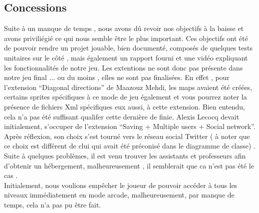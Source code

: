 \documentclass[a4paper,10pt]{article}
\begin{document}
\subsection{Concessions}
Suite à un manque de temps , nous avons dû revoir nos objectifs à la baisse et avons priviliégié ce qui nous semble être le plus important. 
Ces objectifs ont été de pouvoir rendre un projet jouable, bien documenté, composés de quelques tests unitaires sur le côté , mais 
également un rapport fourni et une vidéo expliquant les fonctionnalités de notre jeu. 
Les extentions ne sont donc pas présente dans notre jeu final ... ou du moins , elles ne sont pas finalisées.
En effet , pour l'extension ``Diagonal directions'' de Maazouz Mehdi, les maps avaient été créées, certains sprites spécifiques à ce mode de jeu également
et vous pourrez noter la présence de fichiers Xml spécifiques eux aussi, à cette extension. Bien entendu, cela n'a pas été suffisant qualifer
cette dernière de finie.
Alexis Lecocq devait initialement, s'occuper de l'extension ``Saving + Multiple users + Social network''. Après réflexion, son choix
s'est tourné vers le réseau social Twitter ( à noter que ce choix est différent de clui qui avait été préconisé dans le diagramme de classe)
. Suite à quelques problèmes, il est venu trouver les assistants et professeurs afin d'obtenir un hébergement,
malheureusement , il semblerait que ca n'est pas été le cas .\\

Initialement, nous voulions empêcher le joueur de pouvoir accéder à tous les niveaux immédiatement en mode arcade, malheureusement, par manque
de temps, cela n'a pas pu être fait.
\end{document}
